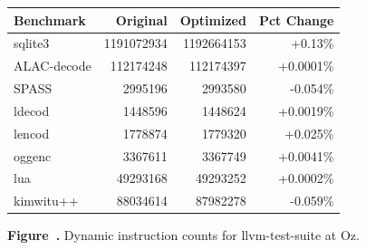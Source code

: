 \par\vspace{1.2em}

\begin{center}
{\normalfont\normalsize
\setlength{\tabcolsep}{5pt}
\renewcommand{\arraystretch}{1.08}
\begin{tabular}{@{}lrrr@{}}
\toprule
Benchmark & Original & Optimized & Pct Change \\
\midrule
sqlite3      & 1191072934 & 1192664153 & +0.13\% \\
ALAC-decode  & 112174248  & 112174397  & +0.0001\% \\
SPASS        & 2995196    & 2993580    & -0.054\% \\
ldecod       & 1448596    & 1448624    & +0.0019\% \\
lencod       & 1778874    & 1779320    & +0.025\% \\
oggenc       & 3367611    & 3367749    & +0.0041\% \\
lua          & 49293168   & 49293252   & +0.0002\% \\
kimwitu++    & 88034614   & 87982278   & -0.059\% \\
\bottomrule
\end{tabular}
}
\end{center}

\vspace{0.12em}

\label{fig:figure12}

\begin{center}
\small\textbf{Figure~\thefigure.} Dynamic instruction counts for llvm-test-suite at Oz.
\end{center}

\par\vspace{1.2em}
